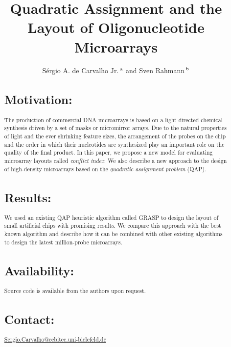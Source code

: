 \documentclass{bioinfo}
\begin{document}

\title[Quadratic assignment and microarray design]{Quadratic Assignment and the Layout of Oligonucleotide Microarrays}
\author[de Carvalho Jr. and Rahmann]{S\'ergio A. de Carvalho Jr.\,$^{\rm a}$ and Sven Rahmann\,$^{\rm b}$}
\address{$^{\rm a}$Graduiertenkolleg Bioinformatik, Bielefeld University, Germany,\\$^{\rm b}$Algorithms and Statistics for Systems Biology, Genome Informatics, Bielefeld University, Germany.}
\maketitle

\begin{abstract}
\section{Motivation:}
The production of commercial DNA microarrays is based on a light-directed chemical synthesis driven by a set of masks or micromirror arrays. Due to the natural properties of light and the ever shrinking feature sizes, the arrangement of the probes on the chip and the order in which their nucleotides are synthesized play an important role on the quality of the final product. In this paper, we propose a new model for evaluating microarray layouts called \emph{conflict index}. We also describe a new approach to the design of high-density microarrays based on the \emph{quadratic assignment problem} (QAP).
\section{Results:}
We used an existing QAP heuristic algorithm called GRASP to design the layout of small artificial chips with promising results. We compare this approach with the best known algorithm and describe how it can be combined with other existing algorithms to design the latest million-probe microarrays.
\section{Availability:}
Source code is available from the authors upon request.
\section{Contact:} \href{Sergio.Carvalho@cebitec.uni-bielefeld.de}{Sergio.Carvalho@cebitec.uni-bielefeld.de}
\end{abstract}
\end{document}
